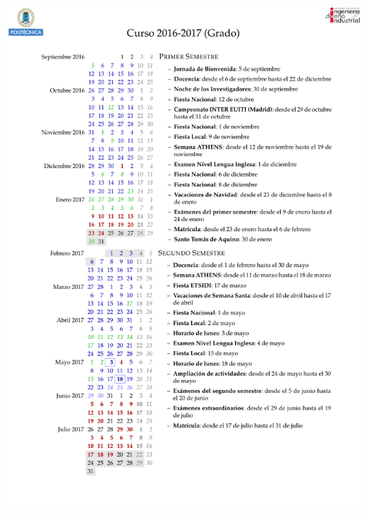 \documentclass[spanish, xcolor={usenames,svgnames,dvipsnames}]{beamer}
\begin{document}
\begin{frame}[label={sec:org1847a9b}]{}
\begin{center}
\includegraphics[width=.9\linewidth]{images/Calendario_Grado_2016_2017.pdf}
\end{center}
\end{frame}
\end{document}
